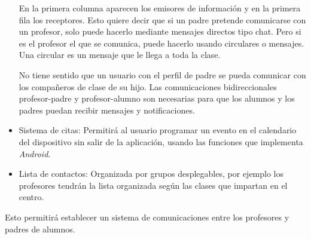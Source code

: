 \begin{itemize}
			En la primera columna aparecen los emisores de información y en la primera fila los receptores. Esto quiere decir que si un padre pretende comunicarse con un profesor, solo puede hacerlo mediante mensajes directos tipo chat. Pero si es el profesor el que se comunica, puede hacerlo usando circulares o mensajes. Una circular es un mensaje que le llega a toda la clase.
			
			\bigskip
			No tiene sentido que un usuario con el perfil de padre se pueda comunicar con los compañeros de clase de su hijo.
			\newline
			Las comunicaciones bidireccionales profesor-padre y profesor-alumno son necesarias para que los alumnos y los padres puedan recibir mensajes y notificaciones.
			
			\item Sistema de citas: Permitirá al usuario programar un evento en el calendario del dispositivo sin salir de la aplicación, usando las funciones que implementa {\it Android}.
			\item Lista de contactos: Organizada por grupos desplegables, por ejemplo los profesores tendrán la lista organizada según las clases que impartan en el centro.
		\end{itemize}
	
		Esto permitirá establecer un sistema de comunicaciones entre los profesores y padres de alumnos.

